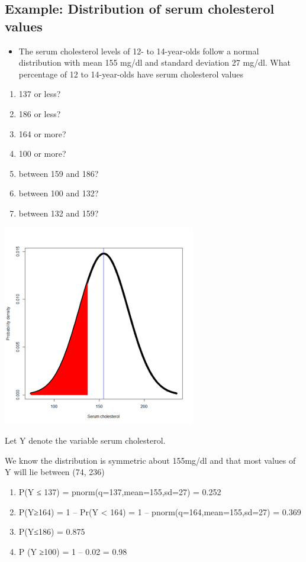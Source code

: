 \documentclass[
]{book}
\providecommand{\tightlist}{%
  \setlength{\itemsep}{0pt}\setlength{\parskip}{0pt}}
\begin{document}
\hypertarget{example-distribution-of-serum-cholesterol-values}{%
\subsection{Example: Distribution of serum cholesterol values}\label{example-distribution-of-serum-cholesterol-values}}

\begin{itemize}
\tightlist
\item
  The serum cholesterol levels of 12- to 14-year-olds follow a normal distribution with mean 155 mg/dl and standard deviation 27 mg/dl. What percentage of 12 to 14-year-olds have serum cholesterol values
\end{itemize}

\begin{enumerate}
\def\labelenumi{\alph{enumi})}
\item
  137 or less?
\item
  186 or less?
\item
  164 or more?
\item
  100 or more?
\item
  between 159 and 186?
\item
  between 100 and 132?
\item
  between 132 and 159?
\end{enumerate}

\includegraphics[width=0.5\linewidth]{./2_52}

Let Y denote the variable serum cholesterol.

We know the distribution is symmetric about 155mg/dl and that most values of Y will lie between (74, 236)

\begin{enumerate}
\def\labelenumi{\alph{enumi})}
\item
  P(Y ≤ 137) = pnorm(q=137,mean=155,sd=27) = 0.252
\item
  P(Y≥164) = 1 -- Pr(Y \textless{} 164) = 1 -- pnorm(q=164,mean=155,sd=27) = 0.369
\item
  P(Y≤186) = 0.875
\item
  P (Y ≥100) = 1 -- 0.02 = 0.98
\end{enumerate}
\end{document}
